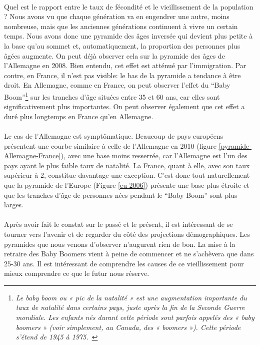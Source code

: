 \paragraph{}Quel est le rapport entre le taux de fécondité et le vieillissement de la population ? Nous avons vu que chaque génération va en engendrer une autre, moins nombreuse, mais que les anciennes générations continuent à vivre un certain temps. Nous avons donc une pyramide des âges inversée qui devient plus petite à la base qu’au sommet et, automatiquement, la proportion des personnes plus âgées augmente. On peut déjà observer cela sur la pyramide des âges de l’Allemagne en 2008. Bien entendu, cet effet est atténué par l’immigration. Par contre, en France, il n’est pas visible: le bas de la pyramide a tendance à être droit.  En Allemagne, comme en France, on peut observer l’effet du “Baby Boom”\footnote{\textit{Le baby boom ou « pic de la natalité » est une augmentation importante du taux de natalité dans certains pays, juste après la fin de la Seconde Guerre mondiale. Les enfants nés durant cette période sont parfois appelés des « baby boomers » (voir simplement, au Canada, des « boomers »). Cette période s'étend de 1945 à 1975.}~\citep{baby-boom}} sur les tranches d'âge situées entre 35 et 60 ans, car elles sont significativement plus importantes. On peut observer également que cet effet a duré plus longtemps en France qu'en Allemagne.

\paragraph{}Le cas de l’Allemagne est symptômatique. Beaucoup de pays européens présentent une courbe similaire à celle de l’Allemagne en 2010 (figure \ref{pyramide-Allemagne-France}), avec une base moins resserrée, car l’Allemagne est l'un des pays ayant le plus faible taux de natalité. La France, quant à elle, avec son taux supérieur à 2, constitue davantage une exception. C’est donc tout naturellement que la pyramide de l’Europe (Figure \ref{eu-2006}) présente une base plus étroite et que les tranches d'âge de personnes nées pendant le “Baby Boom” sont plus larges. 

\paragraph{}Après avoir fait le constat sur le passé et le présent, il est intéressant de se tourner vers l’avenir et de regarder du côté des projections démographiques. Les pyramides que nous venons d’observer n’augurent rien de bon. La mise à la retraire des Baby Boomers vient à peine de commencer et ne s’achèvera que dans 25-30 ans. Il est intéressant de comprendre les causes de ce vieillissement pour mieux comprendre ce que le futur nous réserve. 

